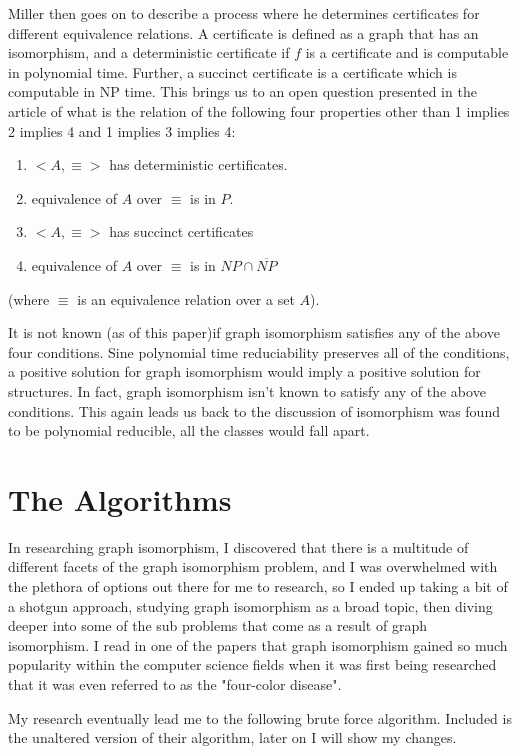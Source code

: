 \documentclass[notitlepage]{report}
\begin{document}
Miller then goes on to describe a process  where he determines certificates for different equivalence relations. A certificate is defined as a graph that has an isomorphism, and a deterministic certificate if $f$ is a certificate and is computable in polynomial time. Further, a succinct certificate is a certificate which is computable in NP time. This brings us to an open question presented in the article of what is the relation of the following four properties other than 1 implies 2 implies 4 and 1 implies 3 implies 4:

\begin{enumerate}
\item $<A,\equiv>$ has deterministic certificates.
\item equivalence of $A$ over $\equiv$ is in $P$.
\item $<A,\equiv>$ has succinct certificates
\item equivalence of $A$ over $\equiv$ is in $NP \cap \overline{NP}$
\end{enumerate}
(where $\equiv$ is an equivalence relation over a set $A$).

It is not known (as of this paper)if graph isomorphism satisfies any of the above four conditions. Sine polynomial time reduciability preserves all of the conditions, a positive solution for graph isomorphism would imply a positive solution for structures. In fact, graph isomorphism isn't known to satisfy any of the above conditions. This again leads us back to the discussion of isomorphism was found to be polynomial reducible, all the classes would fall apart.~\cite{miller}

\section*{The Algorithms}
In researching graph isomorphism, I discovered that there is a multitude of different facets of the graph isomorphism problem, and I was overwhelmed with the plethora of options out there for me to research, so I ended up taking a bit of a shotgun approach, studying graph isomorphism as a broad topic, then diving deeper into some of the sub problems that come as a result of graph isomorphism. I read in one of the papers that graph isomorphism gained so much popularity within the computer science fields when it was first being researched that it was even referred to as the "four-color disease".~\cite{read}

My research eventually lead me to the following brute force algorithm. Included is the unaltered version of their algorithm, later on I will show my changes.
\end{document}

